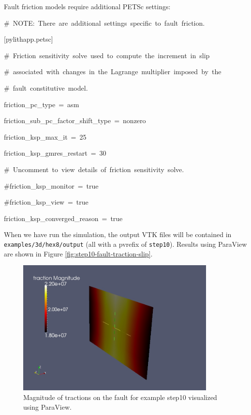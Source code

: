 Fault friction models require additional PETSc settings:
\begin{lyxcode}
\#~NOTE:~There~are~additional~settings~specific~to~fault~friction.

{[}pylithapp.petsc{]}

\#~Friction~sensitivity~solve~used~to~compute~the~increment~in~slip

\#~associated~with~changes~in~the~Lagrange~multiplier~imposed~by~the

\#~fault~constitutive~model.

friction\_pc\_type~=~asm

friction\_sub\_pc\_factor\_shift\_type~=~nonzero

friction\_ksp\_max\_it~=~25

friction\_ksp\_gmres\_restart~=~30

\#~Uncomment~to~view~details~of~friction~sensitivity~solve.

\#friction\_ksp\_monitor~=~true

\#friction\_ksp\_view~=~true

friction\_ksp\_converged\_reason~=~true


\end{lyxcode}
When we have run the simulation, the output VTK files will be contained
in \texttt{examples/3d/hex8/output} (all with a pvrefix of \texttt{step10}).
Results using ParaView are shown in Figure \vref{fig:step10-fault-traction-slip}.

\begin{figure}
\begin{centering}
\includegraphics[width=10cm]{tutorials/3dhex8/figs/step10-fault-traction-slip}
\par\end{centering}

\caption{Magnitude of tractions on the fault for example step10 visualized
using ParaView. \label{fig:step10-fault-traction-slip}}
\end{figure}



